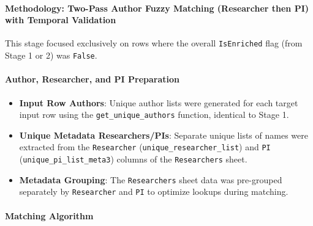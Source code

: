 \documentclass[12pt]{article}
\providecommand{\tightlist}{%
  \setlength{\itemsep}{0pt}\setlength{\parskip}{0pt}}
\begin{document}
\paragraph{Methodology: Two-Pass Author Fuzzy Matching
(Researcher then PI) with Temporal
Validation}\label{methodology-two-pass-author-fuzzy-matching-researcher-then-pi-with-temporal-validation}

This stage focused exclusively on rows where the overall
\texttt{IsEnriched} flag (from Stage 1 or 2) was \texttt{False}.

\paragraph{Author, Researcher, and PI
Preparation}\label{author-researcher-and-pi-preparation}

\begin{itemize}
\tightlist
\item
  \textbf{Input Row Authors}: Unique author lists were generated for
  each target input row using the \texttt{get\_unique\_authors}
  function, identical to Stage 1.
\item
  \textbf{Unique Metadata Researchers/PIs}: Separate unique lists of
  names were extracted from the \texttt{Researcher}
  (\texttt{unique\_researcher\_list}) and \texttt{PI}
  (\texttt{unique\_pi\_list\_meta3}) columns of the \texttt{Researchers}
  sheet.
\item
  \textbf{Metadata Grouping}: The \texttt{Researchers} sheet data was
  pre-grouped separately by \texttt{Researcher} and \texttt{PI} to
  optimize lookups during matching.
\end{itemize}

\paragraph{Matching Algorithm}\label{matching-algorithm-2}
\end{document}

